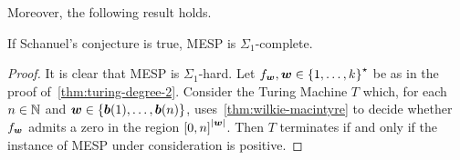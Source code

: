 Moreover, the following result holds.

\begin{theorem}
  If Schanuel's conjecture is true, MESP is $\Sigma_{1}$-complete.
\end{theorem}

\begin{proof}
  It is clear that MESP is $\Sigma_{1}$-hard.
  Let $f_{\boldsymbol{w}}, \boldsymbol{w} \in {\lbrace 1, \ldots, k \rbrace}^{\star}$ be as in the proof of~\cref{thm:turing-degree-2}.
  Consider the Turing Machine $T$ which, for each $n \in \mathbb{N}$ and $\boldsymbol{w} \in \lbrace \boldsymbol{b}(1), \ldots, \boldsymbol{b}(n) \rbrace$, uses~\cref{thm:wilkie-macintyre} to decide whether $f_{\boldsymbol{w}}$ admits a zero in the region ${[0,n]}^{\lvert \boldsymbol{w} \rvert}$.
  Then $T$ terminates if and only if the instance of MESP under consideration is positive.
\end{proof}
